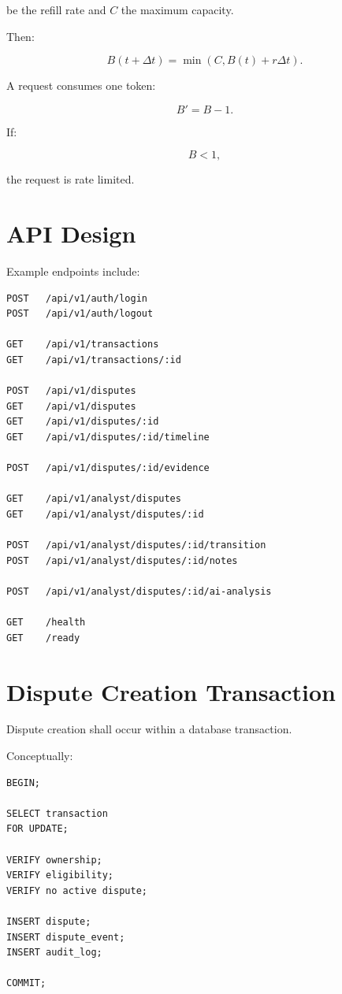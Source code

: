 \documentclass[11pt,a4paper]{article}
\begin{document}
be the refill rate and \(C\) the maximum capacity.

Then:

\[
B(t+\Delta t)
=
\min
\left(
C,
B(t)+r\Delta t
\right).
\]

A request consumes one token:

\[
B' = B-1.
\]

If:

\[
B<1,
\]

the request is rate limited.

\section{API Design}

Example endpoints include:

\begin{lstlisting}
POST   /api/v1/auth/login
POST   /api/v1/auth/logout

GET    /api/v1/transactions
GET    /api/v1/transactions/:id

POST   /api/v1/disputes
GET    /api/v1/disputes
GET    /api/v1/disputes/:id
GET    /api/v1/disputes/:id/timeline

POST   /api/v1/disputes/:id/evidence

GET    /api/v1/analyst/disputes
GET    /api/v1/analyst/disputes/:id

POST   /api/v1/analyst/disputes/:id/transition
POST   /api/v1/analyst/disputes/:id/notes

POST   /api/v1/analyst/disputes/:id/ai-analysis

GET    /health
GET    /ready
\end{lstlisting}

\section{Dispute Creation Transaction}

Dispute creation shall occur within a database transaction.

Conceptually:

\begin{lstlisting}
BEGIN;

SELECT transaction
FOR UPDATE;

VERIFY ownership;
VERIFY eligibility;
VERIFY no active dispute;

INSERT dispute;
INSERT dispute_event;
INSERT audit_log;

COMMIT;
\end{lstlisting}
\end{document}
